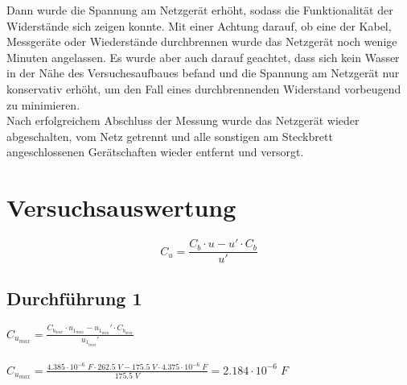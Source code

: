 \documentclass[a4paper,12pt]{article}
\begin{document}
Dann wurde die Spannung am Netzgerät erhöht, sodass die Funktionalität der Widerstände sich zeigen konnte. Mit einer Achtung darauf, ob eine der Kabel, Messgeräte oder Wiederstände durchbrennen wurde das Netzgerät noch wenige Minuten angelassen. Es wurde aber auch darauf geachtet, dass sich kein Wasser in der Nähe des Versuchesaufbaues befand und die Spannung am Netzgerät nur konservativ erhöht, um den Fall eines durchbrennenden Widerstand vorbeugend zu minimieren.\\

Nach erfolgreichem Abschluss der Messung wurde das Netzgerät wieder abgeschalten, vom Netz getrennt und alle sonstigen am Steckbrett angeschlossenen Gerätschaften wieder entfernt und versorgt.


\newpage

\section{Versuchsauswertung}

$$C_u = \frac{C_b \cdot u - u' \cdot C_b}{u'}$$

\subsection{Durchführung 1}

$C_{u_{max}} = \displaystyle{\frac{C_{b_{max}}\cdot u_{1_{max}}-u_{1_{min}}'\cdot C_{b_{min}}}{u_{1_{min}}'}}$\\\\

$C_{u_{max}} = \displaystyle{\frac{4.385\cdot 10^{-6}\;F\cdot 262.5\;V-175.5\;V\cdot 4.375\cdot 10^{-6}\;F}{175.5\;V}} = 2.184\cdot 10^{-6}\;F$\\\\
\end{document}
